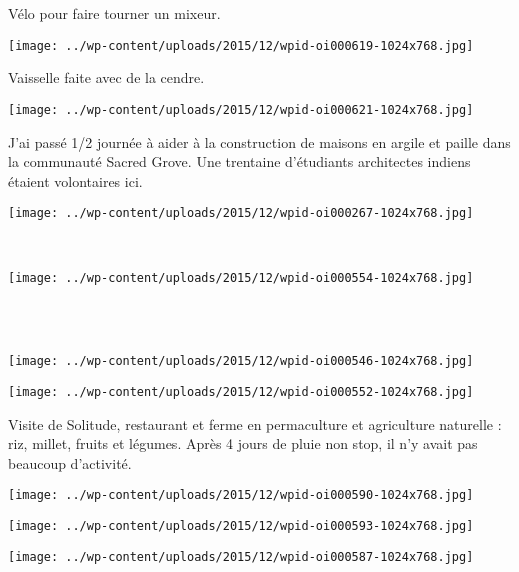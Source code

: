  Vélo pour faire tourner un mixeur. 
\begin{center} \texttt{[image: ../wp-content/uploads/2015/12/wpid-oi000619-1024x768.jpg]} \end{center}
\vspace{-\topsep}
\pagebreak

  Vaisselle faite avec de la cendre. 
\begin{center} \texttt{[image: ../wp-content/uploads/2015/12/wpid-oi000621-1024x768.jpg]} \end{center}

 J'ai passé 1/2 journée à aider à la construction de maisons en argile et paille dans la communauté Sacred Grove. Une trentaine d'étudiants architectes indiens étaient volontaires ici. 
\begin{center} \texttt{[image: ../wp-content/uploads/2015/12/wpid-oi000267-1024x768.jpg]} \end{center}
\vspace{-\topsep}
\pagebreak

~
\begin{center} \texttt{[image: ../wp-content/uploads/2015/12/wpid-oi000554-1024x768.jpg]} \end{center}
~\\~\\
\begin{center} \texttt{[image: ../wp-content/uploads/2015/12/wpid-oi000546-1024x768.jpg]} \end{center}
\begin{center} \texttt{[image: ../wp-content/uploads/2015/12/wpid-oi000552-1024x768.jpg]} \end{center}

 Visite de Solitude, restaurant et ferme en permaculture et agriculture naturelle : riz, millet, fruits et légumes. Après 4 jours de pluie non stop, il n'y avait pas beaucoup d'activité. 
\begin{center} \texttt{[image: ../wp-content/uploads/2015/12/wpid-oi000590-1024x768.jpg]} \end{center}
\begin{center} \texttt{[image: ../wp-content/uploads/2015/12/wpid-oi000593-1024x768.jpg]} \end{center}
\vfill
\begin{center} \texttt{[image: ../wp-content/uploads/2015/12/wpid-oi000587-1024x768.jpg]} \end{center}
\vspace{-\topsep}
\vspace{-0.75mm}
